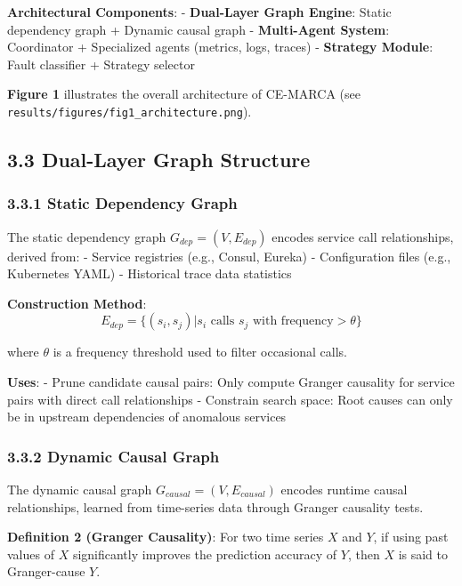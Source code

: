 \textbf{Architectural Components}: - \textbf{Dual-Layer Graph Engine}:
Static dependency graph + Dynamic causal graph - \textbf{Multi-Agent
System}: Coordinator + Specialized agents (metrics, logs, traces) -
\textbf{Strategy Module}: Fault classifier + Strategy selector

\textbf{Figure 1} illustrates the overall architecture of CE-MARCA (see
\texttt{results/figures/fig1\_architecture.png}).

\hypertarget{dual-layer-graph-structure}{%
\subsection{3.3 Dual-Layer Graph
Structure}\label{dual-layer-graph-structure}}

\hypertarget{static-dependency-graph}{%
\subsubsection{3.3.1 Static Dependency
Graph}\label{static-dependency-graph}}

The static dependency graph \(G_{dep} = (V, E_{dep})\) encodes service
call relationships, derived from: - Service registries (e.g., Consul,
Eureka) - Configuration files (e.g., Kubernetes YAML) - Historical trace
data statistics

\textbf{Construction Method}:
\[E_{dep} = \{(s_i, s_j) | s_i \text{ calls } s_j \text{ with frequency} > \theta\}\]

where \(\theta\) is a frequency threshold used to filter occasional
calls.

\textbf{Uses}: - Prune candidate causal pairs: Only compute Granger
causality for service pairs with direct call relationships - Constrain
search space: Root causes can only be in upstream dependencies of
anomalous services

\hypertarget{dynamic-causal-graph}{%
\subsubsection{3.3.2 Dynamic Causal Graph}\label{dynamic-causal-graph}}

The dynamic causal graph \(G_{causal} = (V, E_{causal})\) encodes
runtime causal relationships, learned from time-series data through
Granger causality tests.

\textbf{Definition 2 (Granger Causality)}: For two time series \(X\) and
\(Y\), if using past values of \(X\) significantly improves the
prediction accuracy of \(Y\), then \(X\) is said to Granger-cause \(Y\).

